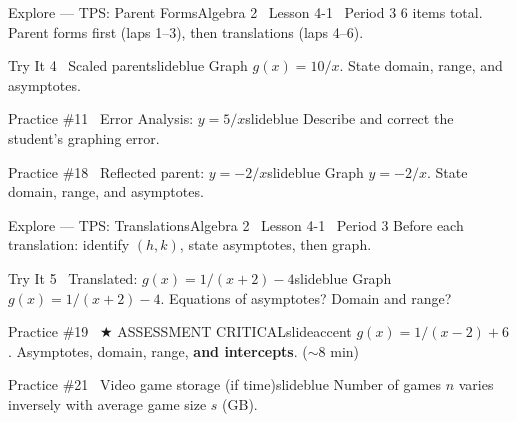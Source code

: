\documentclass[aspectratio=169, 11pt]{beamer}
\begin{document}
\begin{frame}{Explore --- TPS: Parent Forms}{Algebra 2 \textperiodcentered\ Lesson 4-1 \textperiodcentered\ Period 3}
\small\textcolor{slidegray}{6 items total. Parent forms first (laps 1--3), then translations (laps 4--6).}

\vspace{0.1cm}
\begin{projcard}{Try It 4 \textperiodcentered\ Scaled parent}{slideblue}
Graph \(g(x) = 10/x\). State domain, range, and asymptotes.
\end{projcard}
\vspace{-0.2cm}
\begin{projcard}{Practice \#11 \textperiodcentered\ Error Analysis: \(y = 5/x\)}{slideblue}
Describe and correct the student's graphing error.
\end{projcard}
\vspace{-0.2cm}
\begin{projcard}{Practice \#18 \textperiodcentered\ Reflected parent: \(y = -2/x\)}{slideblue}
Graph \(y = -2/x\). State domain, range, and asymptotes.
\end{projcard}
\end{frame}

\begin{frame}{Explore --- TPS: Translations}{Algebra 2 \textperiodcentered\ Lesson 4-1 \textperiodcentered\ Period 3}
\small\textcolor{slidegray}{Before each translation: identify \((h,k)\), state asymptotes, then graph.}

\vspace{0.1cm}
\begin{projcard}{Try It 5 \textperiodcentered\ Translated: \(g(x) = 1/(x+2) - 4\)}{slideblue}
Graph \(g(x) = 1/(x+2) - 4\). Equations of asymptotes? Domain and range?
\end{projcard}
\vspace{-0.2cm}
\begin{projcard}{Practice \#19 \textperiodcentered\ \(\bigstar\) ASSESSMENT CRITICAL}{slideaccent}
\(g(x) = 1/(x-2) + 6\). Asymptotes, domain, range, \textbf{and intercepts}. (\(\sim\)8 min)
\end{projcard}
\vspace{-0.2cm}
\begin{projcard}{Practice \#21 \textperiodcentered\ Video game storage (if time)}{slideblue}
Number of games \(n\) varies inversely with average game size \(s\) (GB).
\end{projcard}
\end{frame}
\end{document}
